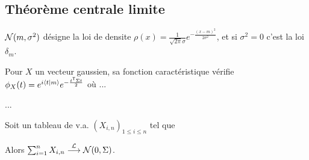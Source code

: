 \subsection{Théorème centrale limite}

	\begin{note}
		$\mathcal{N}(m,\sigma^2)$ désigne la loi de densite $\rho(x) = \frac{1}{\sqrt{2\pi} \sigma} e^{-\frac{(x - m)^2}{2 \sigma^2}}$, et si $\sigma^2 = 0$ c'est la loi $\delta_m$.
	\end{note}

	Pour $X$ un vecteur gaussien, sa fonction caractéristique vérifie $\phi_X(t) = e^{i\left\langle t \mid m \right\rangle} e^{-\frac{t^\mathsf{T} \Sigma t}{2}}$ où ...
	
	\begin{thm}
		...
	\end{thm}

	\begin{thm}[de Linderbergh]
		Soit un tableau de v.a. $(X_{i,n})_{1 \leq i \leq n}$ tel que
		\begin{itemize}
			\item[\textbullet] $\forall n$, les v.a $X_{1,n},\ldots,X_{n,n}$ sont indépendantes,
			\item[\textbullet] $\forall n, \forall i \leq n, \esp(X_{i,n}) = 0$,
			\item[\textbullet] $\lim_n \sum_{i = 1}^n \Cov(X_{i,n}) = \Sigma$
			\item[\textbullet] $\forall \varepsilon > 0, \lim_n \sum_{i = 1}^n \esp(\norme{X_{i,1}^2 \indic_{\norme{X_{i,n}} > \varepsilon) = 0$.
		\end{itemize}
		Alors $\sum_{i = 1}^n X_{i,n} \overset{\mathcal{L}}{\longrightarrow} \normale(0,\Sigma)$.
	\end{thm}
